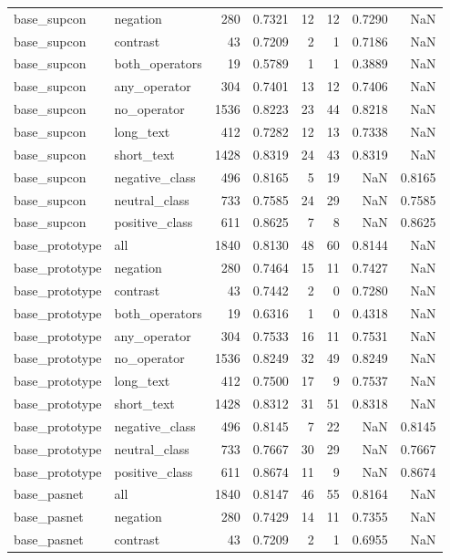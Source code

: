 \begin{tabular}{llrrrrrr}
base\_supcon & negation & 280 & 0.7321 & 12 & 12 & 0.7290 & NaN \\
base\_supcon & contrast & 43 & 0.7209 & 2 & 1 & 0.7186 & NaN \\
base\_supcon & both\_operators & 19 & 0.5789 & 1 & 1 & 0.3889 & NaN \\
base\_supcon & any\_operator & 304 & 0.7401 & 13 & 12 & 0.7406 & NaN \\
base\_supcon & no\_operator & 1536 & 0.8223 & 23 & 44 & 0.8218 & NaN \\
base\_supcon & long\_text & 412 & 0.7282 & 12 & 13 & 0.7338 & NaN \\
base\_supcon & short\_text & 1428 & 0.8319 & 24 & 43 & 0.8319 & NaN \\
base\_supcon & negative\_class & 496 & 0.8165 & 5 & 19 & NaN & 0.8165 \\
base\_supcon & neutral\_class & 733 & 0.7585 & 24 & 29 & NaN & 0.7585 \\
base\_supcon & positive\_class & 611 & 0.8625 & 7 & 8 & NaN & 0.8625 \\
base\_prototype & all & 1840 & 0.8130 & 48 & 60 & 0.8144 & NaN \\
base\_prototype & negation & 280 & 0.7464 & 15 & 11 & 0.7427 & NaN \\
base\_prototype & contrast & 43 & 0.7442 & 2 & 0 & 0.7280 & NaN \\
base\_prototype & both\_operators & 19 & 0.6316 & 1 & 0 & 0.4318 & NaN \\
base\_prototype & any\_operator & 304 & 0.7533 & 16 & 11 & 0.7531 & NaN \\
base\_prototype & no\_operator & 1536 & 0.8249 & 32 & 49 & 0.8249 & NaN \\
base\_prototype & long\_text & 412 & 0.7500 & 17 & 9 & 0.7537 & NaN \\
base\_prototype & short\_text & 1428 & 0.8312 & 31 & 51 & 0.8318 & NaN \\
base\_prototype & negative\_class & 496 & 0.8145 & 7 & 22 & NaN & 0.8145 \\
base\_prototype & neutral\_class & 733 & 0.7667 & 30 & 29 & NaN & 0.7667 \\
base\_prototype & positive\_class & 611 & 0.8674 & 11 & 9 & NaN & 0.8674 \\
base\_pasnet & all & 1840 & 0.8147 & 46 & 55 & 0.8164 & NaN \\
base\_pasnet & negation & 280 & 0.7429 & 14 & 11 & 0.7355 & NaN \\
base\_pasnet & contrast & 43 & 0.7209 & 2 & 1 & 0.6955 & NaN \\

\end{tabular}
